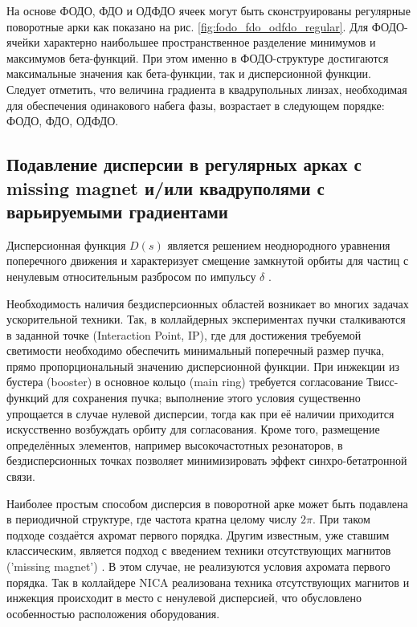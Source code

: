 \par На основе ФОДО, ФДО и ОДФДО ячеек могут быть сконструированы регулярные поворотные арки как показано на рис. \ref{fig:fodo_fdo_odfdo_regular}. Для ФОДО-ячейки характерно наибольшее пространственное разделение минимумов и максимумов бета-функций. При этом именно в ФОДО-структуре достигаются максимальные значения как бета-функции, так и дисперсионной функции. Следует отметить, что величина градиента в квадрупольных линзах, необходимая для обеспечения одинакового набега фазы, возрастает в следующем порядке: ФОДО, ФДО, ОДФДО. 

	\subsection{Подавление дисперсии в регулярных арках с missing magnet и/или квадруполями с варьируемыми градиентами}\label{sec:transition_jump/suppression}

\par Дисперсионная функция $D(s)$ является решением неоднородного уравнения поперечного движения и характеризует смещение замкнутой орбиты для частиц с ненулевым относительным разбросом по импульсу $\delta$ \cite{lee}.

\par Необходимость наличия бездисперсионных областей возникает во многих задачах ускорительной техники. Так, в коллайдерных экспериментах пучки сталкиваются в заданной точке (Interaction Point, IP), где для достижения требуемой светимости необходимо обеспечить минимальный поперечный размер пучка, прямо пропорциональный значению дисперсионной функции. При инжекции из бустера (booster) в основное кольцо (main ring) требуется согласование Твисс-функций для сохранения пучка; выполнение этого условия существенно упрощается в случае нулевой дисперсии, тогда как при её наличии приходится искусственно возбуждать орбиту для согласования. Кроме того, размещение определённых элементов, например высокочастотных резонаторов, в бездисперсионных точках позволяет минимизировать эффект синхро-бетатронной связи.

\par Наиболее простым способом дисперсия в поворотной арке может быть подавлена в периодичной структуре, где частота кратна целому числу $2\pi$. При таком подходе создаётся ахромат первого порядка. Другим известным, уже ставшим классическим, является подход с введением техники отсутствующих магнитов ('missing magnet') \cite{autin:dispersion}. В этом случае, не реализуются условия ахромата первого порядка. Так в коллайдере NICA реализована техника отсутствующих магнитов и инжекция происходит в место с ненулевой дисперсией, что обусловлено особенностью расположения оборудования.

